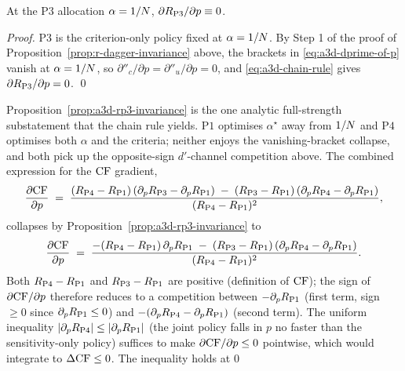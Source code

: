\begin{proposition}[$\Rpthree$ at $\alpha = 1/\Nloc$ is $p$-invariant]
\label{prop:a3d-rp3-invariance}
At the $\textrm{P3}$ allocation $\alpha = 1/\Nloc$,
$\partial R_{\mathrm{P3}}/\partial p \equiv 0$.
\end{proposition}

\begin{proof}
$\textrm{P3}$ is the criterion-only policy fixed at $\alpha = 1/\Nloc$.
By Step 1 of the proof of
Proposition~\ref{prop:r-dagger-invariance} above, the brackets in
\eqref{eq:a3d-dprime-of-p} vanish at $\alpha = 1/\Nloc$, so
$\partial \dprime_c/\partial p = \partial \dprime_u/\partial p =
0$, and \eqref{eq:a3d-chain-rule} gives
$\partial R_{\mathrm{P3}}/\partial p = 0$. \qed
\end{proof}

Proposition~\ref{prop:a3d-rp3-invariance} is the one analytic
full-strength substatement that the chain rule yields. $\textrm{P1}$
optimises $\alpha^\star$ away from $1/N$ and $\textrm{P4}$
optimises both $\alpha$ and the criteria; neither enjoys the
vanishing-bracket collapse, and both pick up the opposite-sign
$d'$-channel competition above. The combined expression for the
$\mathrm{CF}$ gradient,
\begin{equation*}
  \frac{\partial \mathrm{CF}}{\partial p}
  \;=\;
  \frac{(R_{\mathrm{P4}} - R_{\mathrm{P1}})\,(\partial_p R_{\mathrm{P3}}
                              - \partial_p R_{\mathrm{P1}})
       \;-\; (R_{\mathrm{P3}} - R_{\mathrm{P1}})\,(\partial_p R_{\mathrm{P4}}
                              - \partial_p R_{\mathrm{P1}})}
       {(R_{\mathrm{P4}} - R_{\mathrm{P1}})^2},
\end{equation*}
collapses by Proposition~\ref{prop:a3d-rp3-invariance} to
\begin{equation*}
  \frac{\partial \mathrm{CF}}{\partial p}
  \;=\;
  \frac{-(R_{\mathrm{P4}} - R_{\mathrm{P1}})\,\partial_p R_{\mathrm{P1}}
       \;-\; (R_{\mathrm{P3}} - R_{\mathrm{P1}})\,(\partial_p R_{\mathrm{P4}}
                              - \partial_p R_{\mathrm{P1}})}
       {(R_{\mathrm{P4}} - R_{\mathrm{P1}})^2}.
\end{equation*}
Both $R_{\mathrm{P4}} - R_{\mathrm{P1}}$ and $R_{\mathrm{P3}} - R_{\mathrm{P1}}$ are positive
(definition of $\mathrm{CF}$); the sign of $\partial \mathrm{CF}/\partial p$
therefore reduces to a competition between
$-\partial_p R_{\mathrm{P1}}$ (first term, sign $\ge 0$ since
$\partial_p R_{\mathrm{P1}} \le 0$) and
$-(\partial_p R_{\mathrm{P4}} - \partial_p R_{\mathrm{P1}})$ (second term). The
uniform inequality
$|\partial_p R_{\mathrm{P4}}| \le |\partial_p R_{\mathrm{P1}}|$ (the joint policy
falls in $p$ no faster than the sensitivity-only policy) suffices
to make $\partial \mathrm{CF}/\partial p \le 0$ pointwise, which would
integrate to $\Delta\mathrm{CF} \le 0$. The inequality holds at $0$
